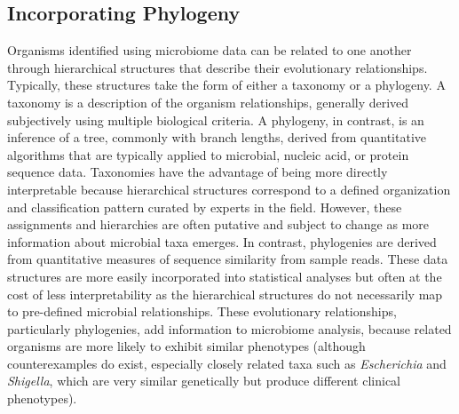 \subsection{Incorporating Phylogeny} Organisms identified using microbiome data can be related to one another through hierarchical structures that describe their evolutionary relationships. Typically, these structures take the form of either a taxonomy or a phylogeny. A taxonomy is a description of the organism relationships, generally derived subjectively using multiple biological criteria. A phylogeny, in contrast, is an inference of a tree, commonly with branch lengths, derived from quantitative algorithms that are typically applied to microbial, nucleic acid, or protein sequence data. Taxonomies have the advantage of being more directly interpretable because hierarchical structures correspond to a defined organization and classification pattern curated by experts in the field. However, these assignments and hierarchies are often putative and subject to change as more information about microbial taxa emerges. In contrast, phylogenies are derived from quantitative measures of sequence similarity from sample reads. These data structures are more easily incorporated into statistical analyses but often at the cost of less interpretability as the hierarchical structures do not necessarily map to pre-defined microbial relationships. These evolutionary relationships, particularly phylogenies, add information to microbiome analysis, because related organisms are more likely to exhibit similar phenotypes (although counterexamples do exist, especially closely related taxa such as \textit{Escherichia} and \textit{Shigella}, which are very similar genetically but produce different clinical phenotypes).


